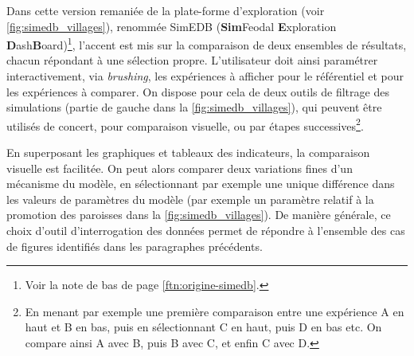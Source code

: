 Dans cette version remaniée de la plate-forme d'exploration (voir \cref{fig:simedb_villages}), renommée SimEDB\label{par:introduction-nom-simedb} (\textbf{Sim}Feodal \textbf{E}xploration \textbf{D}ash\textbf{B}oard)\footnote{
	Voir la note de bas de page \ref{ftn:origine-simedb}.
}, l'accent est mis sur la comparaison de deux ensembles de résultats, chacun répondant à une sélection propre.
L'utilisateur doit ainsi \og paramétrer\fg{} interactivement, via \textit{brushing}, les expériences à afficher pour le référentiel et pour les expériences à comparer.
On dispose pour cela de deux outils de filtrage des simulations (partie de gauche dans la \cref{fig:simedb_villages}), qui peuvent être utilisés de concert, pour comparaison visuelle, ou par étapes successives\footnote{
	En menant par exemple une première comparaison entre une expérience \og A\fg{} en haut et \og B\fg{} en bas, puis en sélectionnant \og C\fg{} en haut, puis \og D\fg{} en bas etc.
	On compare ainsi A avec B, puis B avec C, et enfin C avec D.
}.

En superposant les graphiques et tableaux des indicateurs, la comparaison visuelle est facilitée.
On peut alors comparer deux variations fines d'un mécanisme du modèle, en sélectionnant par exemple une unique différence dans les valeurs de paramètres du modèle (par exemple un paramètre relatif à la promotion des paroisses dans la \cref{fig:simedb_villages}).
De manière générale, ce choix d'outil d'interrogation des données permet de répondre à l'ensemble des cas de figures identifiés dans les paragraphes précédents.

